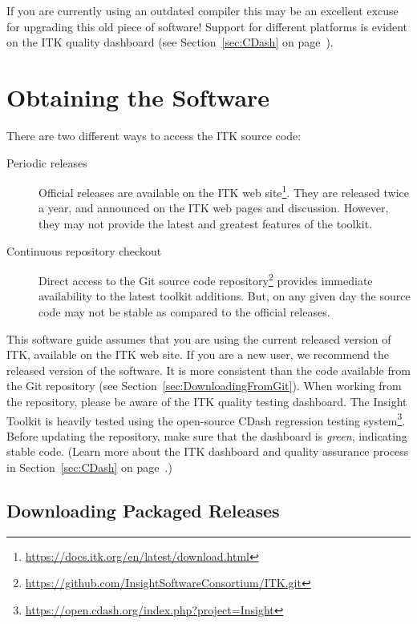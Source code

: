 If you are currently using an outdated compiler this may be an excellent excuse
for upgrading this old piece of software! Support for different platforms is
evident on the ITK quality dashboard (see Section~\ref{sec:CDash}
on page~\pageref{sec:CDash}).

\section{Obtaining the Software}%
\label{sec:ObtainingTheSoftware}%
\label{sec:DownloadingITK}%

There are two different ways to access the ITK source code:
\begin{description}
  \item[Periodic releases]{Official releases are available on the ITK web
    site\footnote{\url{https://docs.itk.org/en/latest/download.html}}.
    They are released twice a year,
    and announced on the ITK web pages and discussion.
    However, they may not provide the latest and greatest features of the
    toolkit.}
  \item[Continuous repository checkout]{Direct access to the Git source code
    repository\footnote{\url{https://github.com/InsightSoftwareConsortium/ITK.git}} provides immediate
    availability to the latest toolkit additions. But, on any given day the
    source code may not be stable as compared to the official releases.}
\end{description}

This software guide assumes that you are using the current released version of
ITK, available on the ITK web site. If you are a new user, we recommend the
released version of the software. It is more consistent
than the code available from the Git repository (see Section~\ref{sec:DownloadingFromGit}).
When working from the repository, please be aware of the ITK quality testing dashboard. The Insight
Toolkit is heavily tested using the open-source CDash regression testing
system\footnote{\url{https://open.cdash.org/index.php?project=Insight}}. Before
updating the repository, make sure that the dashboard is \emph{green},
indicating stable code. (Learn more about the ITK dashboard and quality
assurance process in Section~\ref{sec:CDash} on page~\pageref{sec:CDash}.)

\subsection{Downloading Packaged Releases}%
\label{sec:DownloadingReleases}%

